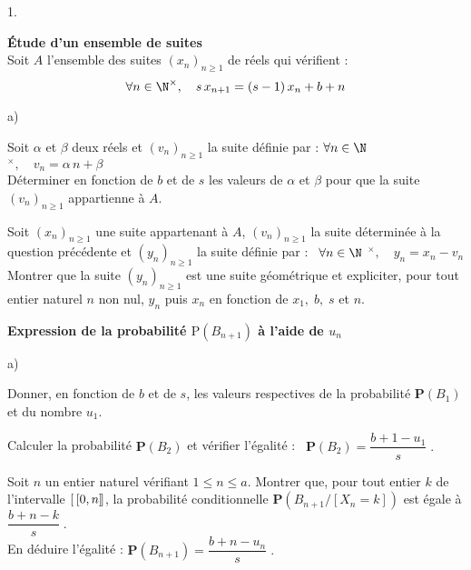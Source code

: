 \documentclass[11pt]{article}%
\begin{document}
\begin{noliste}{1.}
 \setlength{\itemsep}{4mm}
\item \textbf{Étude d'un ensemble de suites}\label{A}\\
Soit $A$ l'ensemble des suites $(x_{n})_{n\geq 1}$ de réels qui
vérifient : 
\[
\forall n\in \N^{\times },\quad s\,x_{n + 1} = (s-1)\,x_{n} + b + n
\]

\begin{noliste}{a)}
 \setlength{\itemsep}{2mm}
\item \label{vn} Soit $\alpha $ et $\beta $ deux réels et
$(v_{n})_{n\geq 1}$ la suite définie par : \quad $\forall n\in \N
$ $^{\times },\quad v_{n} = \alpha \,n + \beta $\.\\
Déterminer en fonction de $b$ et de $s$ les valeurs de $\alpha $ et
$\beta $
pour que la suite $(v_{n})_{n\geq 1}$ appartienne à $A$.

\item Soit $(x_{n})_{n\geq 1}$ une suite appartenant à $A$,
$(v_{n})_{n\geq 1}$ la suite déterminée à la question précédente et
$(y_{n})_{n\geq 1}$ la suite définie par : \ $\forall n\in \N$
$^{\times },\quad y_{n} = x_{n}-v_{n}$\.\\
Montrer que la suite $(y_{n})_{n\geq 1}$ est une suite géométrique et
expliciter, pour tout entier naturel $n$ non nul, $y_{n}$ puis $x_{n}$
en
fonction de $x_{1},\;b,\;s$ et $n$.
\end{noliste}

\item \textbf{Expression de la probabilité $\text{P}(B_{n + 1})$ à
l'aide de $u_{n}$}

\begin{noliste}{a)}
 \setlength{\itemsep}{2mm}
\item Donner, en fonction de $b$ et de $s$, les valeurs respectives de
la
probabilité $\mathbf{P}(B_{1})$ et du nombre $u_{1}$.

\item Calculer la probabilité $\mathbf{P}(B_{2})$ et vérifier l'égalité
: \ $\mathbf{P}(B_{2}) = \dfrac{b + 1-u_{1}}{s}\;.$

\item Soit $n$ un entier naturel vérifiant $1\leq n\leq a$.
Montrer que, pour tout entier $k$ de l'intervalle $[ \
\hspace{-0.15em}[0,n]\hspace{-0.13em}]$, la probabilité conditionnelle
$\mathbf{P}(B_{n + 1}/[X_{n} = k])$ est égale à $\dfrac{b + n-k}{s}\;.$
\\
En déduire l'égalité : \quad $\mathbf{P}(B_{n + 1}) = \dfrac{b +
n-u_{n}}{s}\;.$


\end{noliste}
\end{noliste}
\end{document}
